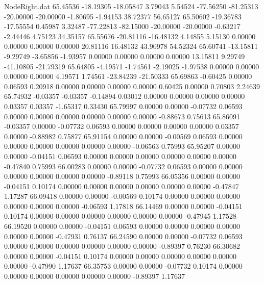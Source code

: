 \begin{filecontents}{NodeRight.dat}
  65.45536  -18.19305  -18.05847     3.79043    5.54524  -77.56250  -81.25313  -20.00000  -20.00000   -1.80695   -1.94153   38.72377   56.65127
  65.50602  -19.36783  -17.55554     0.45987    3.32487  -77.22813  -82.15000  -20.00000  -20.00000   -0.63217   -2.44446    4.75123   34.35157
  65.55676  -20.81116  -16.48132     4.14855    5.15130    0.00000    0.00000    0.00000    0.00000   20.81116   16.48132   43.90978   54.52324
  65.60741  -13.15811   -9.29749    -3.65856   -1.93957    0.00000    0.00000    0.00000    0.00000   13.15811    9.29749  -41.10805  -21.79319
  65.64805   -4.19571   -1.74561    -2.19025   -1.97538    0.00000    0.00000    0.00000    0.00000    4.19571    1.74561  -23.84239  -21.50333
  65.69863   -0.60425    0.00000     0.06593    0.20918    0.00000    0.00000    0.00000    0.00000    0.60425    0.00000    0.70803    2.24639
  65.74932   -0.03357   -0.03357    -0.14894    0.03012    0.00000    0.00000    0.00000    0.00000    0.03357    0.03357   -1.65317    0.33430
  65.79997    0.00000    0.00000    -0.07732    0.06593    0.00000    0.00000    0.00000    0.00000    0.00000    0.00000   -0.88673    0.75613
  65.86091   -0.03357    0.00000    -0.07732    0.06593    0.00000    0.00000    0.00000    0.00000    0.03357    0.00000   -0.88982    0.75877
  65.91154    0.00000    0.00000    -0.00569    0.06593    0.00000    0.00000    0.00000    0.00000    0.00000    0.00000   -0.06563    0.75993
  65.95207    0.00000    0.00000    -0.04151    0.06593    0.00000    0.00000    0.00000    0.00000    0.00000    0.00000   -0.47840    0.75993
  66.00283    0.00000    0.00000    -0.07732    0.06593    0.00000    0.00000    0.00000    0.00000    0.00000    0.00000   -0.89118    0.75993
  66.05356    0.00000    0.00000    -0.04151    0.10174    0.00000    0.00000    0.00000    0.00000    0.00000    0.00000   -0.47847    1.17287
  66.09418    0.00000    0.00000    -0.00569    0.10174    0.00000    0.00000    0.00000    0.00000    0.00000    0.00000   -0.06593    1.17818
  66.14469    0.00000    0.00000    -0.04151    0.10174    0.00000    0.00000    0.00000    0.00000    0.00000    0.00000   -0.47945    1.17528
  66.19520    0.00000    0.00000    -0.04151    0.06593    0.00000    0.00000    0.00000    0.00000    0.00000    0.00000   -0.47931    0.76137
  66.24590    0.00000    0.00000    -0.07732    0.06593    0.00000    0.00000    0.00000    0.00000    0.00000    0.00000   -0.89397    0.76230
  66.30682    0.00000    0.00000    -0.04151    0.10174    0.00000    0.00000    0.00000    0.00000    0.00000    0.00000   -0.47990    1.17637
  66.35753    0.00000    0.00000    -0.07732    0.10174    0.00000    0.00000    0.00000    0.00000    0.00000    0.00000   -0.89397    1.17637

\end{filecontents}

